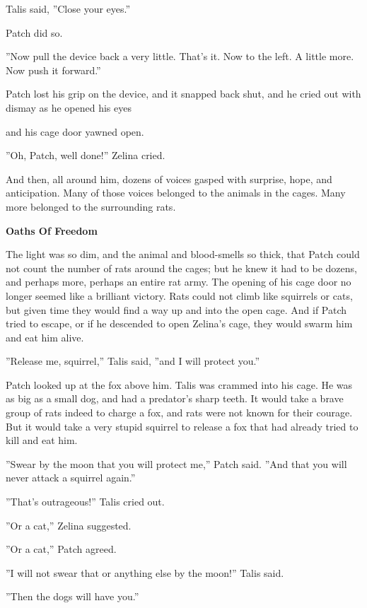 \documentclass[11pt]{article}
\begin{document}
Talis said, ''Close your eyes.''\par
Patch did so.\par
''Now pull the device back a very little. That's it. Now to the left. A little more. Now push it forward.''\par
Patch lost his grip on the device, and it snapped back shut, and he cried out with dismay as he opened his eyes %
\par
 and his cage door yawned open.\par
''Oh, Patch, well done!'' Zelina cried.\par
And then, all around him, dozens of voices gasped with surprise, hope, and anticipation. Many of those voices belonged to the animals in the cages. Many more belonged to the surrounding rats.\par
\par
{\bf Oaths Of Freedom\par
}\par
 The light was so dim, and the animal and blood-smells so thick, that Patch could not count the number of rats around the cages; but he knew it had to be dozens, and perhaps more, perhaps an entire rat army. The opening of his cage door no longer seemed like a brilliant victory. Rats could not climb like squirrels or cats, but given time they would find a way up and into the open cage. And if Patch tried to escape, or if he descended to open Zelina's cage, they would swarm him and eat him alive.\par
 ''Release me, squirrel,'' Talis said, ''and I will protect you.''\par
 Patch looked up at the fox above him. Talis was crammed into his cage. He was as big as a small dog, and had a predator's sharp teeth. It would take a brave group of rats indeed to charge a fox, and rats were not known for their courage. But it would take a very stupid squirrel to release a fox that had already tried to kill and eat him.\par
 ''Swear by the moon that you will protect me,'' Patch said. ''And that you will never attack a squirrel again.''\par
 ''That's outrageous!'' Talis cried out.\par
 ''Or a cat,'' Zelina suggested.\par
 ''Or a cat,'' Patch agreed.\par
 ''I will not swear that or anything else by the moon!'' Talis said.\par
 ''Then the dogs will have you.''\par
\end{document}
